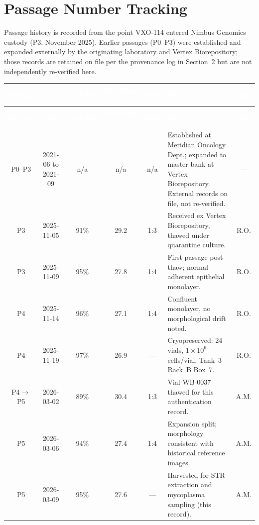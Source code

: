 
\section{Passage Number Tracking}

Passage history is recorded from the point VXO-114 entered Nimbus Genomics custody
(P3, November 2025). Earlier passages (P0--P3) were established and expanded externally
by the originating laboratory and Vertex Biorepository; those records are retained on file
per the provenance log in Section~2 but are not independently re-verified here.

\begin{longtable}{@{} c c c c c p{4.6cm} c @{}}
  \toprule
  \rowcolor{labnavy}
  \textcolor{white}{\textbf{Passage}} & \textcolor{white}{\textbf{Date}} &
  \textcolor{white}{\textbf{Viability}} & \textcolor{white}{\textbf{Doubling (h)}} &
  \textcolor{white}{\textbf{Split}} & \textcolor{white}{\textbf{Notes}} &
  \textcolor{white}{\textbf{Init.}} \\
  \midrule
  \endfirsthead
  \rowcolor{labnavy}
  \textcolor{white}{\textbf{Passage}} & \textcolor{white}{\textbf{Date}} &
  \textcolor{white}{\textbf{Viability}} & \textcolor{white}{\textbf{Doubling (h)}} &
  \textcolor{white}{\textbf{Split}} & \textcolor{white}{\textbf{Notes}} &
  \textcolor{white}{\textbf{Init.}} \\
  \midrule
  \endhead
  P0--P3 & 2021-06 to 2021-09 & n/a & n/a & n/a & Established at Meridian Oncology Dept.; expanded to master bank at Vertex Biorepository. External records on file, not re-verified. & --- \\
  P3 & 2025-11-05 & 91\% & 29.2 & 1:3 & Received ex Vertex Biorepository, thawed under quarantine culture. & R.O. \\
  P3 & 2025-11-09 & 95\% & 27.8 & 1:4 & First passage post-thaw; normal adherent epithelial monolayer. & R.O. \\
  P4 & 2025-11-14 & 96\% & 27.1 & 1:4 & Confluent monolayer, no morphological drift noted. & R.O. \\
  P4 & 2025-11-19 & 97\% & 26.9 & --- & Cryopreserved: 24 vials, $1\times10^{6}$ cells/vial, Tank~3 Rack~B Box~7. & R.O. \\
  P4$\to$P5 & 2026-03-02 & 89\% & 30.4 & 1:3 & Vial WB-0037 thawed for this authentication record. & A.M. \\
  P5 & 2026-03-06 & 94\% & 27.4 & 1:4 & Expansion split; morphology consistent with historical reference images. & A.M. \\
  P5 & 2026-03-09 & 95\% & 27.6 & --- & Harvested for STR extraction and mycoplasma sampling (this record). & A.M. \\
  \bottomrule
\end{longtable}

